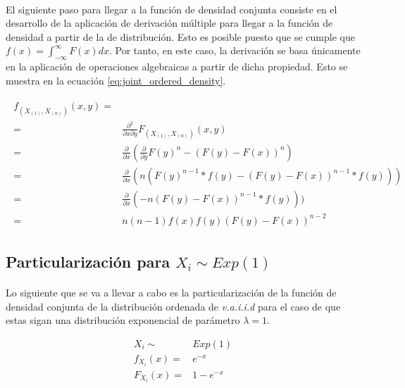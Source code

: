 \documentclass{article}
\begin{document}
    \paragraph{}
    El siguiente paso para llegar a la función de densidad conjunta consiste en el desarrollo de la aplicación de derivación múltiple para llegar a la función de densidad a partir de la de distribución. Esto es posible puesto que se cumple que $f(x)= \int_{-\infty}^{\infty} F(x) dx$. Por tanto, en este caso, la derivación se basa únicamente en la aplicación de operaciones algebraicas a partir de dicha propiedad. Esto se muestra en la ecuación \ref{eq:joint_ordered_density}.

    \begin{align}
      \label{eq:joint_ordered_density}
      \begin{split}
        f_{(X_{(1)}, X_{(n)})} (x,y) =& \\
        =& \frac{\partial^2}{\partial x \partial y}F_{(X_{(1)}, X_{(n)})} (x,y) \\
        =& \frac{\partial}{\partial x}( \frac{\partial}{\partial y} F(y)^n - (F(y)-F(x))^n) \\
        =& \frac{\partial}{\partial x}( n (F(y)^{n-1}*f(y) - (F(y)-F(x))^{n-1}*f(y))) \\
        =& \frac{\partial}{\partial x}( -n (F(y)-F(x))^{n-1}*f(y))) \\
        =& n(n-1)f(x)f(y)(F(y) - F(x))^{n-2}
      \end{split}
    \end{align}

    \subsection{Particularización para $X_i \sim Exp(1)$}

      \paragraph{}
      Lo siguiente que se va a llevar a cabo es la particularización de la función de densidad conjunta de la distribución ordenada de \emph{v.a.i.i.d} para el caso de que estas sigan una distribución exponencial de parámetro $\lambda = 1$.

      \begin{align*}
        X_i \sim& Exp(1)\\
        f_{X_{i}}(x) =& e^{-x}\\
        F_{X_{i}}(x) =& 1-e^{-x} \\
      \end{align*}
\end{document}

